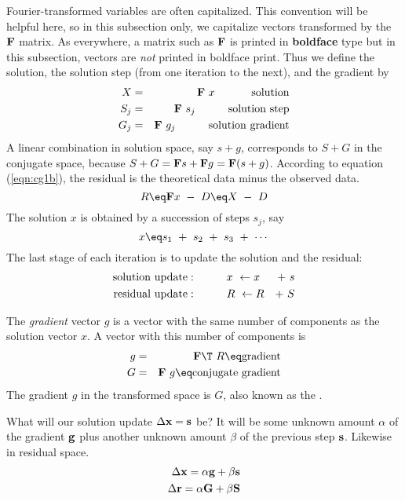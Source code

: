 Fourier-transformed variables are often capitalized.
This convention will be helpful here,
so in this subsection only,
we capitalize vectors transformed by the  $\bold F$  matrix.
As everywhere, a matrix such as $\bold F$
is printed in {\bf boldface} type
but in this subsection,
vectors are {\it not} printed in boldface print.
Thus we define the solution, the solution step
(from one iteration to the next),
and the gradient by
\begin{eqnarray}
X   &=& \bold F \  x\   \quad\quad\quad  {\rm solution}         \\
S_j &=& \bold F \  s_j  \quad\quad\quad  {\rm solution\ step}    \\
G_j &=& \bold F \  g_j  \quad\quad\quad  {\rm solution\ gradient}  
\end{eqnarray}
A linear combination in solution space,
say  $s+g$,  corresponds to  $S+G$  in the conjugate space,
because $S+G = \bold F s + \bold F g = \bold F(s+g)$.
According to equation 
(\ref{eqn:cg1b}),
the residual is the theoretical data minus the observed data.
\begin{equation}
R \eq \bold F  x \ -\ D
  \eq          X \ -\ D
\end{equation}
The solution  $x$  is obtained by a succession of steps  $s_j$, say
\begin{equation}
x \eq s_1 \ +\  s_2 \ +\  s_3 \ +\  \cdots
\end{equation}
The last stage of each iteration is to update the solution and the residual:
\begin{eqnarray}
\label{eqn:xupdate}
{\rm solution\ update:} \quad\quad\quad  & x \ \leftarrow  x&  +\  s\\
\label{eqn:Rupdate}
{\rm residual\ update:} \quad\quad\quad  & R \ \leftarrow  R&  +\  S
\end{eqnarray}

\par
The {\it gradient} vector $g$ is a vector with the same number
of components as the solution vector $x$.
A vector with this number of components is
\begin{eqnarray}
g &=& \bold F\T \  R \eq \hbox{gradient}                 \label{eqn:g} \\
G &=& \bold F  \  g \eq \hbox{conjugate gradient}       \label{eqn:G}
\end{eqnarray}
The gradient $g$ in the transformed space is $G$,
also known as the .
\par
What will our solution update $\Delta \bold x=\bold s$ be?
It will be some unknown amount $\alpha$ of the gradient $\bold g$ plus
another unknown amount         $\beta$  of the previous step $\bold s$.
Likewise in residual space.
\begin{eqnarray}
\Delta \bold x = \alpha \bold g + \beta \bold s
\\
\Delta \bold r = \alpha \bold G + \beta \bold S
\end{eqnarray}


